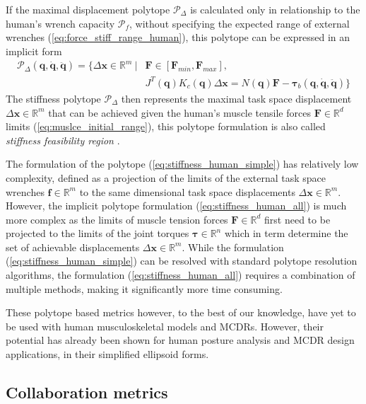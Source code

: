 If the maximal displacement polytope $\mathcal{P}_\Delta$ is calculated only in relationship to the human's wrench capacity $\mathcal{P}_f$, without specifying the expected range of external wrenches (\ref{eq:force_stiff_range_human}), this polytope can be expressed in an implicit form
\begin{equation}
\begin{split}
    \mathcal{P}_\Delta(\bm{q},\dot{\bm{q}},\ddot{\bm{q}}) =\! \{ \Delta\bm{x} \in \mathbb{R}^m ~|&\bm{F}\in\left[\bm{F}_{min}, \bm{F}_{max} \right]\!,\\ ~ &J^T(\bm{q})K_c(\bm{q})\Delta\bm{x}\!= N(\bm{q})\bm{F}\! -\! \bm{\tau}_b(\bm{q},\dot{\bm{q}},\ddot{\bm{q}}) \}\label{eq:stiffness_human_all}
\end{split}
\end{equation}
The stiffness polytope $\mathcal{P}_\Delta$ then represents the maximal task space displacement $\Delta \bm{x} \in \mathbb{R}^m$ that can be achieved given the human's muscle tensile forces $\bm{F} \in \mathbb{R}^d$ limits (\ref{eq:muslce_initial_range}), this polytope formulation is also called \textit{stiffness feasibility region} \cite{ajoudani2017choosing}.

The formulation of the polytope (\ref{eq:stiffness_human_simple}) has relatively low complexity, defined as a projection of the limits of the external task space wrenches $\bm{f} \in \mathbb{R}^m$ to the same dimensional task space displacements $\Delta \bm{x} \in \mathbb{R}^m$. However, the implicit polytope formulation (\ref{eq:stiffness_human_all}) is much more complex as the limits of muscle tension forces $\bm{F} \in \mathbb{R}^d$ first need to be projected to the limits of the joint torques $\bm{\tau} \in \mathbb{R}^n$ which in term determine the set of achievable displacements $\Delta \bm{x} \in \mathbb{R}^m$. While the formulation  (\ref{eq:stiffness_human_simple}) can be resolved with standard polytope resolution algorithms, the formulation (\ref{eq:stiffness_human_all}) requires a combination of multiple methods, making it significantly more time consuming. 

These polytope based metrics however, to the best of our knowledge, have yet to be used with human musculoskeletal models and MCDRs. However, their potential has already been shown for human posture analysis \cite{Inouye2016} and MCDR design \cite{Ramadoss2021} applications, in their simplified ellipsoid forms.

\subsection{Collaboration metrics}
\label{ch:collab_metrics}

